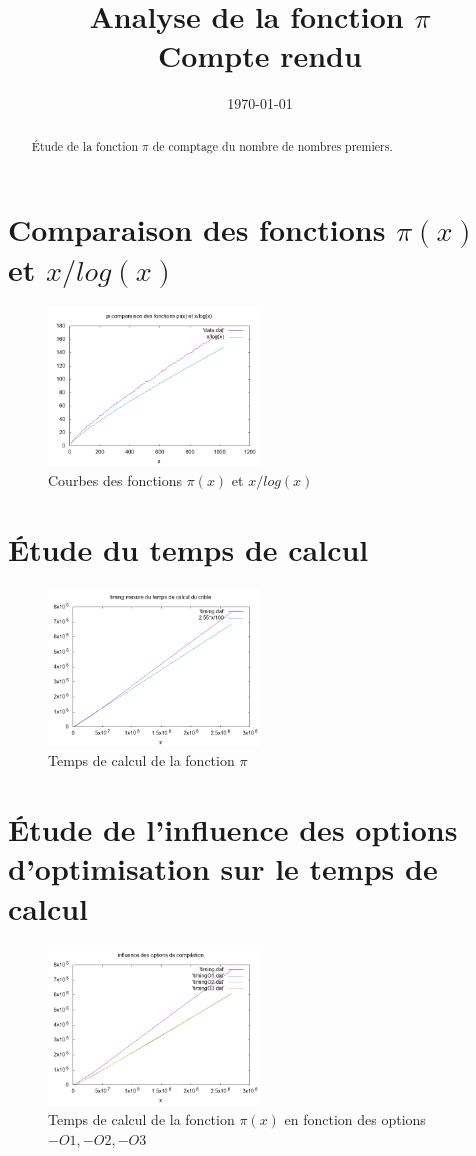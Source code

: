 \documentclass[12pt]{article}
\title{Analyse de la fonction $\pi$\\Compte rendu}
\date{\today}
\begin{document}
\maketitle

\begin{abstract}
  Étude de la fonction $\pi$ de comptage du nombre de nombres
  premiers.
\end{abstract}

\section{Comparaison des fonctions $\pi(x)$ et $x/log(x)$}



\begin{figure}[h]
\caption{Courbes des fonctions $\pi(x)$ et $x/log(x)$}
\centering
\includegraphics[width=0.5\textwidth]{pi}
\end{figure}

\section{Étude du temps de calcul}

\begin{figure}[h]
\caption{Temps de calcul de la fonction $\pi$}
\centering
\includegraphics[width=0.5\textwidth]{timing}
\end{figure}


\section{Étude de l'influence des options d'optimisation sur le temps
  de calcul}

\begin{figure}[h]
  \caption{Temps de calcul de la fonction $\pi(x)$ en fonction des
    options $-O1, -O2, -O3$}
\centering
\includegraphics[width=0.5\textwidth]{timingOx}
\end{figure}
\end{document}
